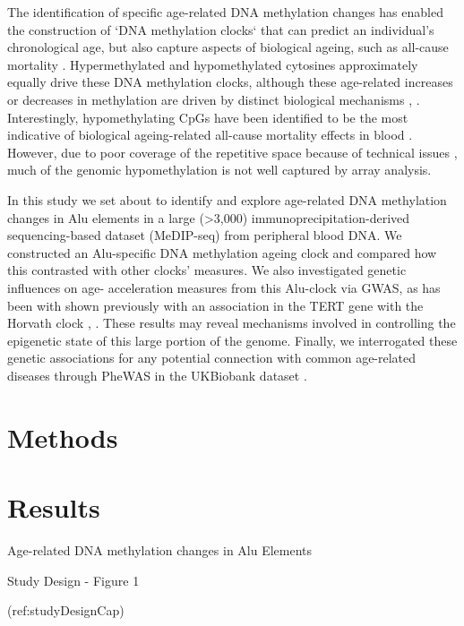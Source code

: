 \documentclass[]{book}
\begin{document}
The identification of specific age-related DNA methylation changes has enabled the construction of `DNA methylation clocks` \citep{Horvath2018} that can predict an individual's chronological age, but also capture aspects of biological ageing, such as all-cause mortality \citep{Marioni2015}.
Hypermethylated and hypomethylated cytosines approximately equally drive these DNA methylation clocks, although these age-related increases or decreases in methylation are driven by distinct biological mechanisms \citep{Mozhui2017}, \citep{Wu2017}.
Interestingly, hypomethylating CpGs have been identified to be the most indicative of biological ageing-related all-cause mortality effects in blood \citep{Zhang2017}.
However, due to poor coverage of the repetitive space because of technical issues \citep{Bell2019}, much of the genomic hypomethylation is not well captured by array analysis.

In this study we set about to identify and explore age-related DNA methylation changes in Alu elements in a large (\textgreater3,000) immunoprecipitation-derived sequencing-based dataset (MeDIP-seq) from peripheral blood DNA. We constructed an Alu-specific DNA methylation ageing clock and compared how this contrasted with other clocks' measures. We also investigated genetic influences on age- acceleration measures from this Alu-clock via GWAS, as has been with shown previously with an association in the TERT gene with the Horvath clock \citep{Lu2017}, \citep{Gibson2019}.
These results may reveal mechanisms involved in controlling the epigenetic state of this large portion of the genome.
Finally, we interrogated these genetic associations for any potential connection with common age-related diseases through PheWAS in the UKBiobank dataset \citep{Bycroft2017}.

\hypertarget{methods-2}{%
\chapter{Methods}\label{methods-2}}

\hypertarget{results-1}{%
\chapter{Results}\label{results-1}}

Age-related DNA methylation changes in Alu Elements

Study Design - Figure 1

(ref:studyDesignCap)
\end{document}

